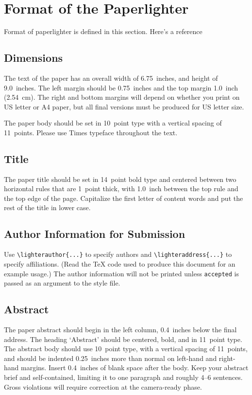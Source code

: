 
\section{Format of the Paperlighter}

Format of paperlighter is defined in this section. Here's a reference \cite{Craddock.2013}

    \subsection{Dimensions}

    The text of the paper has an
    overall width of 6.75~inches, and height of 9.0~inches. The left margin should be 
    0.75~inches and the top margin 1.0~inch (2.54~cm). The right and bottom margins will 
    depend on whether you print on US letter or A4 paper, but all final versions
    must be produced for US letter size.

    The paper body should be set in 10~point type with a vertical spacing
    of 11~points. Please use Times typeface throughout the text.


    \subsection{Title}

    The paper title should be set in 14~point bold type and centered
    between two horizontal rules that are 1~point thick, with 1.0~inch
    between the top rule and the top edge of the page. Capitalize the
    first letter of content words and put the rest of the title in lower
    case.


    \subsection{Author Information for Submission}

    Use \verb+\lighterauthor{...}+ to specify authors and \verb+\lighteraddress{...}+ to 
    specify affiliations. (Read the TeX code used to produce this document for an example 
    usage.) The author information will not be printed unless \texttt{accepted} is passed 
    as an argument to the style file.


    \subsection{Abstract}

    The paper abstract should begin in the left column, 0.4~inches below the final
    address. The heading `Abstract' should be centered, bold, and in 11~point type.
    The abstract body should use 10~point type, with a vertical spacing of
    11~points, and should be indented 0.25~inches more than normal on left-hand and
    right-hand margins. Insert 0.4~inches of blank space after the body. Keep your
    abstract brief and self-contained, limiting it to one paragraph and roughly 4--6
    sentences. Gross violations will require correction at the camera-ready phase.


